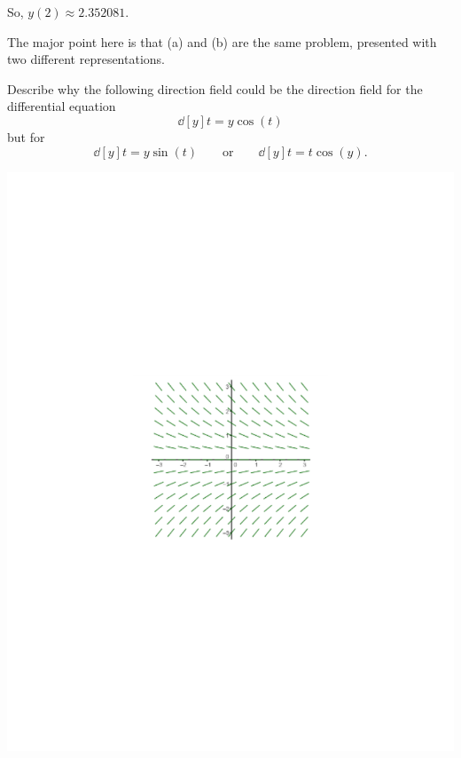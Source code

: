 \documentclass[]{ximera}
\begin{document}
\begin{problem}
\begin{enumerate}
\begin{freeResponse}
	So, $y(2) \approx 2.352081$.
	\end{freeResponse}
	\end{enumerate}
	
\end{problem}

\begin{instructorNotes}
The major point here is that (a) and (b) are the same problem, presented with two different representations.
\end{instructorNotes}







\begin{problem}
Describe why the following direction field could be the direction field for the differential equation 
	\[
	\dd[y]{t} = y \cos(t)
	\]
but  for 
	\[
	\dd[y]{t} = y \sin(t) 	\qquad	\text{or}	\qquad	\dd[y]{t} = t \cos(y).
	\]
	
	\begin{image}
	\includegraphics[trim= 300 280 250 280,scale=0.8]{Figure8-2-2.pdf}
	\end{image}
	\begin{freeResponse}
		

\end{freeResponse}
\end{problem}
\end{document}
